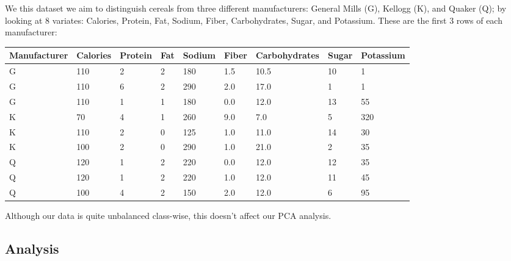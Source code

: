 \documentclass[11pt,a4paper]{article}
\begin{document}
	We this dataset we aim to distinguish cereals from three different manufacturers: General Mills (G), Kellogg (K), and Quaker (Q); by looking at 8 variates: Calories, Protein, Fat, Sodium, Fiber, Carbohydrates, Sugar, and Potassium. These are the first 3 rows of each manufacturer:
	
	\begin{table}[H] \centering
		\begin{tabular}{|l|llllllll|}
			\hline
			\multicolumn{1}{|c|}{Manufacturer} & \multicolumn{1}{c}{Calories} & Protein & Fat & Sodium & Fiber & Carbohydrates & Sugar & Potassium \\ \hline
			G                                  & 110                          & 2       & 2   & 180    & 1.5   & 10.5          & 10    & 1         \\
			G                                  & 110                          & 6       & 2   & 290    & 2.0   & 17.0          & 1     & 1         \\
			G                                  & 110                          & 1       & 1   & 180    & 0.0   & 12.0          & 13    & 55        \\
			K                                  & 70                           & 4       & 1   & 260    & 9.0   & 7.0           & 5     & 320       \\
			K                                  & 110                          & 2       & 0   & 125    & 1.0   & 11.0          & 14    & 30        \\
			K                                  & 100                          & 2       & 0   & 290    & 1.0   & 21.0          & 2     & 35        \\
			Q                                  & 120                          & 1       & 2   & 220    & 0.0   & 12.0          & 12    & 35        \\
			Q                                  & 120                          & 1       & 2   & 220    & 1.0   & 12.0          & 11    & 45        \\
			Q                                  & 100                          & 4       & 2   & 150    & 2.0   & 12.0          & 6     & 95        \\ \hline
		\end{tabular}
	\end{table}

	Although our data is quite unbalanced class-wise, this doesn't affect our PCA analysis.
	
	\subsection{Analysis}
	
\end{document}
